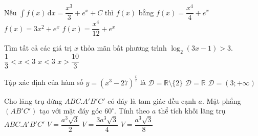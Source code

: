 \begin{ex}%
Nếu $\displaystyle\int f(x)\mathrm{\, d}x=\dfrac{x^3}{3}+e^x+C$ thì $f(x)$ bằng
{$f(x)=\dfrac{x^4}{4}+e^x$}
{$f(x)=3x^2+e^x$}
{$f(x)=\dfrac{x^4}{12}+e^x$}
\end{ex}

\begin{ex}%
Tìm tất cả các giá trị $x$ thỏa mãn bất phương trình $\log_2(3x-1)>3$.
{$\dfrac{1}{3}<x<3$}
{$x<3$}
{$x>\dfrac{10}{3}$}
\end{ex}

\begin{ex}%
Tập xác định của hàm số $y=\left(x^3-27\right)^{\frac{\pi}{2}}$ là
\choice{$\mathscr{D}=[3;+\infty)$}
{$\mathscr{D}=\mathbb{R}\setminus\{ 2\}$}
{$\mathscr{D}=\mathbb{R}$}
{\True $\mathscr{D}=(3;+\infty)$}
\end{ex}

\begin{ex}%
Cho lăng trụ đứng $ABC.A'B'C'$ có đáy là tam giác đều cạnh $a$. Mặt phẳng $(AB'C')$ tạo với mặt đáy góc $60^{\circ}$. Tính theo $a$ thể tích khối lăng trụ $ABC.A'B'C'$
{$V=\dfrac{a^3\sqrt{3}}{2}$}
{$V=\dfrac{3a^3\sqrt{3}}{4}$}
{$V=\dfrac{a^3\sqrt{3}}{8}$}
\end{ex}

